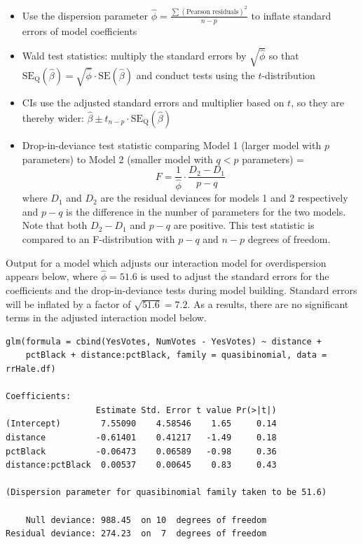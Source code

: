 \documentclass[
]{krantz}
\providecommand{\tightlist}{%
  \setlength{\itemsep}{0pt}\setlength{\parskip}{0pt}}
\begin{document}
\begin{itemize}
\tightlist
\item
  Use the dispersion parameter \(\hat\phi=\frac{\sum(\textrm{Pearson residuals})^2}{n-p}\) to inflate standard errors of model coefficients
\item
  Wald test statistics: multiply the standard errors by \(\sqrt{\hat{\phi}}\) so that \(\textrm{SE}_\textrm{Q}(\hat\beta)=\sqrt{\hat\phi}\cdot\textrm{SE}(\hat\beta)\) and conduct tests using the \(t\)-distribution
\item
  CIs use the adjusted standard errors and multiplier based on \(t\), so they are thereby wider: \(\hat\beta \pm t_{n-p} \cdot \textrm{SE}_\textrm{Q}(\hat\beta)\)
\item
  Drop-in-deviance test statistic comparing Model 1 (larger model with \(p\) parameters) to Model 2 (smaller model with \(q<p\) parameters) =
  \begin{equation}
   F = \frac{1}{\hat\phi} \cdot \frac{D_2 - D_1}{p-q}
   \label{eq:drop12}
   \end{equation}
  where \(D_1\) and \(D_2\) are the residual deviances for models 1 and 2 respectively and \(p-q\) is the difference in the number of parameters for the two models. Note that both \(D_2-D_1\) and \(p-q\) are positive. This test statistic is compared to an F-distribution with \(p-q\) and \(n-p\) degrees of freedom.
\end{itemize}

Output for a model which adjusts our interaction model for overdispersion appears below, where \(\hat{\phi}=51.6\) is used to adjust the standard errors for the coefficients and the drop-in-deviance tests during model building. Standard errors will be inflated by a factor of \(\sqrt{51.6}=7.2\). As a results, there are no significant terms in the adjusted interaction model below.

\begin{verbatim}
glm(formula = cbind(YesVotes, NumVotes - YesVotes) ~ distance + 
    pctBlack + distance:pctBlack, family = quasibinomial, data = rrHale.df)

Coefficients:
                  Estimate Std. Error t value Pr(>|t|)
(Intercept)        7.55090    4.58546    1.65     0.14
distance          -0.61401    0.41217   -1.49     0.18
pctBlack          -0.06473    0.06589   -0.98     0.36
distance:pctBlack  0.00537    0.00645    0.83     0.43

(Dispersion parameter for quasibinomial family taken to be 51.6)

    Null deviance: 988.45  on 10  degrees of freedom
Residual deviance: 274.23  on  7  degrees of freedom
\end{verbatim}
\end{document}
